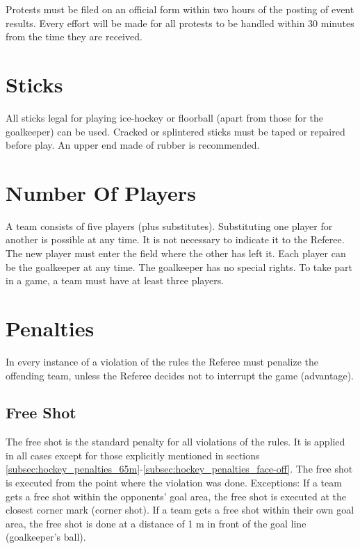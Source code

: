 Protests must be filed on an official form within two hours of the posting of event results.
Every effort will be made for all protests to be handled within 30 minutes from the time they are received.

\section{Sticks}

All sticks legal for playing ice-hockey or floorball (apart from those for the goalkeeper) can be used.
Cracked or splintered sticks must be taped or repaired before play.
An upper end made of rubber is recommended.

\section{Number Of Players}

A team consists of five players (plus substitutes).
Substituting one player for another is possible at any time.
It is not necessary to indicate it to the Referee.
The new player must enter the field where the other has left it.
Each player can be the goalkeeper at any time.
The goalkeeper has no special rights.
To take part in a game, a team must have at least three players.

\section{Penalties}

In every instance of a violation of the rules the Referee must penalize the offending team, unless the Referee decides not to interrupt the game (advantage).

\subsection{Free Shot}

The free shot is the standard penalty for all violations of the rules.
It is applied in all cases except for those explicitly mentioned in sections \ref{subsec:hockey_penalties_65m}-\ref{subsec:hockey_penalties_face-off}.
The free shot is executed from the point where the violation was done.
Exceptions: If a team gets a free shot within the opponents' goal area, the free shot is executed at the closest corner mark (corner shot).
If a team gets a free shot within their own goal area, the free shot is done at a distance of 1 m in front of the goal line (goalkeeper's ball).


